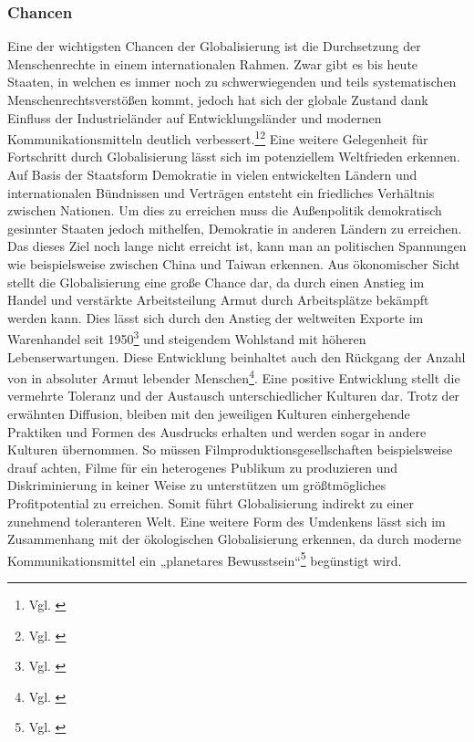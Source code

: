 \documentclass[12pt]{article}
\begin{document}
\subsubsection{Chancen}
Eine der wichtigsten Chancen der Globalisierung ist die Durchsetzung der Menschenrechte in einem internationalen Rahmen. Zwar gibt es bis heute Staaten, in welchen es immer noch zu schwerwiegenden und teils systematischen Menschenrechtsverstößen kommt, jedoch hat sich der globale Zustand dank Einfluss der Industrieländer auf Entwicklungsländer und modernen Kommunikationsmitteln deutlich verbessert.\footnote{Vgl. \cite{Lohrmann}}\footnote{Vgl. \cite{WikipMenschRechte}} 
Eine weitere Gelegenheit für Fortschritt durch Globalisierung lässt sich im potenziellem Weltfrieden erkennen. Auf Basis der Staatsform Demokratie in vielen entwickelten Ländern und internationalen Bündnissen und Verträgen entsteht ein friedliches Verhältnis zwischen Nationen. Um dies zu erreichen muss die Außenpolitik demokratisch gesinnter Staaten jedoch mithelfen, Demokratie in anderen Ländern zu erreichen. Das dieses Ziel noch lange nicht erreicht ist, kann man an politischen Spannungen wie beispielsweise zwischen China und Taiwan erkennen.
Aus ökonomischer Sicht stellt die Globalisierung eine große Chance dar, da durch einen Anstieg im Handel und verstärkte Arbeitsteilung Armut durch Arbeitsplätze bekämpft werden kann. Dies lässt sich durch den Anstieg der weltweiten Exporte im Warenhandel seit 1950\footnote{Vgl. \cite{Urmersbach2021}} und steigendem Wohlstand mit höheren Lebenserwartungen. Diese Entwicklung beinhaltet auch den Rückgang der Anzahl von in absoluter Armut lebender Menschen\footnote{Vgl. \cite{Roser2016}}.
Eine positive Entwicklung stellt die vermehrte Toleranz und der Austausch unterschiedlicher Kulturen dar. Trotz der erwähnten Diffusion, bleiben mit den jeweiligen Kulturen einhergehende Praktiken und Formen des Ausdrucks erhalten und werden sogar in andere Kulturen übernommen. So müssen Filmproduktionsgesellschaften beispielsweise drauf achten, Filme für ein heterogenes Publikum zu produzieren und Diskriminierung in keiner Weise zu unterstützen um größtmögliches Profitpotential zu erreichen. Somit führt Globalisierung indirekt zu einer zunehmend toleranteren Welt. Eine weitere Form des Umdenkens lässt sich im Zusammenhang mit der ökologischen Globalisierung erkennen, da durch moderne Kommunikationsmittel ein „planetares Bewusstsein“\footnote{Vgl. \cite{WikipGlobWirtsch}} begünstigt wird.
\end{document}
